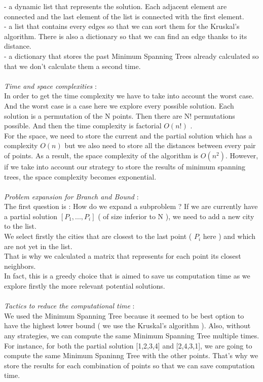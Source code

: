 \documentclass[12pt]{article}
\begin{document}
- a dynamic list that represents the solution. Each adjacent element are connected and the last element of the list is connected with the first element. \\
- a list that contains every edges so that we can sort them for the Kruskal's algorithm. There is also a dictionary so that we can find an edge thanks to its distance. \\
- a dictionary that stores the past Minimum Spanning Trees already calculated so that we don't calculate them a second time. \\
\\
\textit{Time and space complexities} : \\
In order to get the time complexity we have to take into account the worst case. And the worst case is a case here we explore every possible solution. Each solution is a permutation of the N points. Then there are N! permutations possible. And then the time complexity is factorial $O(n!)$ .\\
For the space, we need to store the current and the partial solution which has a complexity $O(n)$ but we also need to store all the distances between every pair of points. As a result, the space complexity of the algorithm is $O(n^2)$. However, if we take into account our strategy to store the results of minimum spanning trees, the space complexity becomes exponential.\\
\\
\textit{Problem expansion for Branch and Bound} : \\
The first question is : How do we expand a subproblem ? If we are currently have a partial solution $[P_1,...,P_i]$ ( of size inferior to N ), we need to add a new city to the list. \\
We select firstly the cities that are closest to the last point ( $P_i$ here ) and which are not yet in the list. \\
That is why we calculated a matrix that represents for each point its closest neighbors. \\
In fact, this is a greedy choice that is aimed to save us computation time as we explore firstly the more relevant potential solutions. \\
\\
\textit{Tactics to reduce the computational time} : \\
We used the Minimum Spanning Tree because it seemed to be best option to have the highest lower bound ( we use the Kruskal's algorithm ). Also, without any strategies, we can compute the same Minimum Spanning Tree multiple times. For instance, for both the partial solution [1,2,3,4] and [2,4,3,1], we are going to compute the same Minimum Spaninng Tree with the other points. That's why we store the results for each combination of points so that we can save computation time. \\
\end{document}
